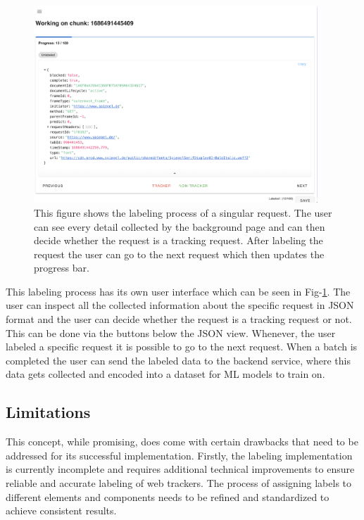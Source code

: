 \begin{figure}
  \begin{center}
    \includegraphics[width=0.95\textwidth]{images/Labeling.png}
  \end{center}
  \caption{This figure shows the labeling process of a singular request. The user can see every detail collected by the 
  background page and can then decide whether the request is a tracking request. After labeling the request the user can 
  go to the next request which then updates the progress bar.
}
  \label{fig:Labeling}
\end{figure}


This labeling process has its own user interface which can be seen in Fig-\ref{fig:Labeling}. The user can inspect all the collected information
about the specific request in JSON format and the user can decide whether the request is a tracking request or not. This can be done via 
the buttons below the JSON view. Whenever, the user labeled a specific request it is possible to go to the next request. When a batch is
completed the user can send the labeled data to the backend service, where this data gets collected and encoded into a dataset for ML
models to train on. 

\subsection{Limitations}
\label{sec:lim}

This concept, while promising, does come with certain drawbacks that need to be addressed for its successful implementation.
Firstly, the labeling implementation is currently incomplete and requires additional technical improvements to ensure reliable
and accurate labeling of web trackers. The process of assigning labels to different elements and components needs to be refined
and standardized to achieve consistent results.

